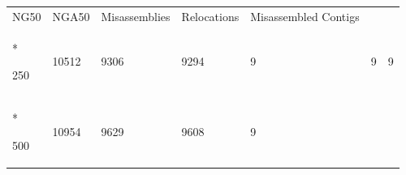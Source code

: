 \documentclass[
  12pt,
  oneside,
  openany]{book}
\begin{document}
\begin{appendices}
\begin{singlespace}
\begin{longtable}[]{@{}lllllll@{}}
\begin{minipage}[b]{0.07\columnwidth}
NG50\strut
\end{minipage} & \begin{minipage}[b]{0.08\columnwidth}\raggedright
NGA50\strut
\end{minipage} & \begin{minipage}[b]{0.17\columnwidth}\raggedright
Misassemblies\strut
\end{minipage} & \begin{minipage}[b]{0.14\columnwidth}\raggedright
Relocations\strut
\end{minipage} & \begin{minipage}[b]{0.12\columnwidth}\raggedright
Misassembled Contigs\strut
\end{minipage}\tabularnewline*
\midrule
\endhead
\begin{minipage}[t]{0.15\columnwidth}\raggedright
250\strut
\end{minipage} & \begin{minipage}[t]{0.08\columnwidth}\raggedright
10512\strut
\end{minipage} & \begin{minipage}[t]{0.07\columnwidth}\raggedright
9306\strut
\end{minipage} & \begin{minipage}[t]{0.08\columnwidth}\raggedright
9294\strut
\end{minipage} & \begin{minipage}[t]{0.17\columnwidth}\raggedright
9\strut
\end{minipage} & \begin{minipage}[t]{0.14\columnwidth}\raggedright
9\strut
\end{minipage} & \begin{minipage}[t]{0.12\columnwidth}\raggedright
9\strut
\end{minipage}\tabularnewline*
\begin{minipage}[t]{0.15\columnwidth}\raggedright
500\strut
\end{minipage} & \begin{minipage}[t]{0.08\columnwidth}\raggedright
10954\strut
\end{minipage} & \begin{minipage}[t]{0.07\columnwidth}\raggedright
9629\strut
\end{minipage} & \begin{minipage}[t]{0.08\columnwidth}\raggedright
9608\strut
\end{minipage} & \begin{minipage}[t]{0.17\columnwidth}\raggedright
9\strut

\end{minipage}
\end{longtable}
\end{singlespace}
\end{appendices}
\end{document}
